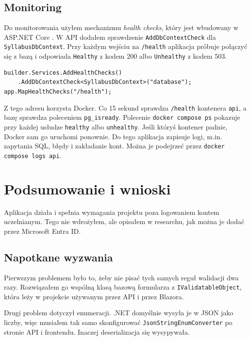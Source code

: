 \documentclass[times]{san}
\begin{document}
\subsection{Monitoring}

Do monitorowania użyłem mechanizmu \textit{health checks}, który jest wbudowany w ASP.NET Core \cite{ms_healthchecks}. W API dodałem sprawdzenie \texttt{AddDbContextCheck} dla \texttt{SyllabusDbContext}. Przy każdym wejściu na \texttt{/health} aplikacja próbuje połączyć się z bazą i odpowiada \texttt{Healthy} z kodem 200 albo \texttt{Unhealthy} z kodem 503.

\begin{lstlisting}[language={[Sharp]C}, caption={Konfiguracja health checks w \texttt{Program.cs}}, label={lst:health}]
builder.Services.AddHealthChecks()
    .AddDbContextCheck<SyllabusDbContext>("database");
app.MapHealthChecks("/health");
\end{lstlisting}

Z tego adresu korzysta Docker. Co 15 sekund sprawdza \texttt{/health} kontenera \texttt{api}, a bazę sprawdza poleceniem \texttt{pg\_isready}. Polecenie \texttt{docker compose ps} pokazuje przy każdej usłudze \texttt{healthy} albo \texttt{unhealthy}. Jeśli któryś kontener padnie, Docker sam go uruchomi ponownie. Do tego aplikacja zapisuje logi, m.in. zapytania SQL, błędy i zakładanie kont. Można je podejrzeć przez \texttt{docker compose logs api}.

\section{Podsumowanie i wnioski}

Aplikacja działa i spełnia wymagania projektu poza logowaniem kontem uczelnianym. Tego nie wdrożyłem, ale opisałem w researchu, jak można je dodać przez Microsoft Entra ID.

\subsection{Napotkane wyzwania}

Pierwszym problemem było to, żeby nie pisać tych samych reguł walidacji dwa razy. Rozwiązałem go wspólną klasą bazową formularza z \texttt{IValidatableObject}, która leży w projekcie używanym przez API i przez Blazora.

Drugi problem dotyczył enumeracji. .NET domyślnie wysyła je w JSON jako liczby, więc musiałem tak samo skonfigurować \texttt{JsonStringEnumConverter} po stronie API i frontendu. Inaczej deserializacja się wysypywała.
\end{document}
